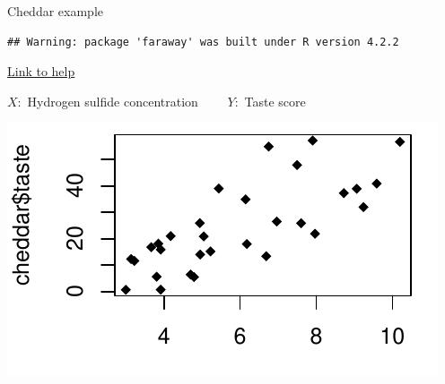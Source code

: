 \documentclass[
  ignorenonframetext,
]{beamer}
\newenvironment{Shaded}{\begin{snugshade}}{\end{snugshade}}
\newcommand{\AttributeTok}[1]{\textcolor[rgb]{0.77,0.63,0.00}{#1}}
\newcommand{\DecValTok}[1]{\textcolor[rgb]{0.00,0.00,0.81}{#1}}
\newcommand{\FloatTok}[1]{\textcolor[rgb]{0.00,0.00,0.81}{#1}}
\newcommand{\FunctionTok}[1]{\textcolor[rgb]{0.00,0.00,0.00}{#1}}
\newcommand{\NormalTok}[1]{#1}
\newcommand{\SpecialCharTok}[1]{\textcolor[rgb]{0.00,0.00,0.00}{#1}}
\begin{document}
\begin{frame}[fragile]{Cheddar example}
\protect\hypertarget{cheddar-example}{}
\begin{verbatim}
## Warning: package 'faraway' was built under R version 4.2.2
\end{verbatim}

\href{./cheddar.html}{Link to help}

\(X:\) Hydrogen sulfide concentration \(\qquad Y:\) Taste score

\begin{Shaded}
\end{Shaded}

\includegraphics{Lec1_files/figure-beamer/che1-1.pdf}
\end{frame}
\end{document}
